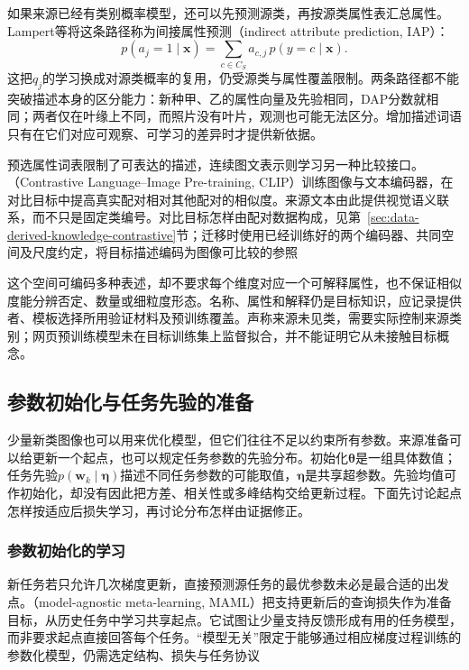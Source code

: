 如果来源已经有类别概率模型，还可以先预测源类，再按源类属性表汇总属性。Lampert等将这条路径称为间接属性预测（indirect attribute prediction, IAP）：
\[
  p(a_j=1\mid\bm x)
  =\sum_{c\in C_S}a_{c,j}\,p(y=c\mid\bm x).
\]
这把$q_j$的学习换成对源类概率的复用，仍受源类与属性覆盖限制。两条路径都不能突破描述本身的区分能力：新种甲、乙的属性向量及先验相同，DAP分数就相同；两者仅在叶缘上不同，而照片没有叶片，观测也可能无法区分。增加描述词语只有在它们对应可观察、可学习的差异时才提供新依据。

预选属性词表限制了可表达的描述，连续图文表示则学习另一种比较接口。（Contrastive Language--Image Pre-training, CLIP）训练图像与文本编码器，在对比目标中提高真实配对相对其他配对的相似度。来源文本由此提供视觉语义联系，而不只是固定类编号。对比目标怎样由配对数据构成，见第~\ref{sec:data-derived-knowledge-contrastive}节；迁移时使用已经训练好的两个编码器、共同空间及尺度约定，将目标描述编码为图像可比较的参照

这个空间可编码多种表述，却不要求每个维度对应一个可解释属性，也不保证相似度能分辨否定、数量或细粒度形态。名称、属性和解释仍是目标知识，应记录提供者、模板选择所用验证材料及预训练覆盖。声称来源未见类，需要实际控制来源类别；网页预训练模型未在目标训练集上监督拟合，并不能证明它从未接触目标概念。

\subsection{参数初始化与任务先验的准备}
\label{sec:ket-transfer-initialization-prior}

少量新类图像也可以用来优化模型，但它们往往不足以约束所有参数。来源准备可以给更新一个起点，也可以规定任务参数的先验分布。初始化$\bm\theta$是一组具体数值；任务先验$p(\bm w_k\mid\bm\eta)$描述不同任务参数的可能取值，$\bm\eta$是共享超参数。先验均值可作初始化，却没有因此把方差、相关性或多峰结构交给更新过程。下面先讨论起点怎样按适应后损失学习，再讨论分布怎样由证据修正。

\subsubsection{参数初始化的学习}
\label{sec:ket-transfer-maml}

新任务若只允许几次梯度更新，直接预测源任务的最优参数未必是最合适的出发点。（model-agnostic meta-learning, MAML）把支持更新后的查询损失作为准备目标，从历史任务中学习共享起点。它试图让少量支持反馈形成有用的任务模型，而非要求起点直接回答每个任务。“模型无关”限定于能够通过相应梯度过程训练的参数化模型，仍需选定结构、损失与任务协议

